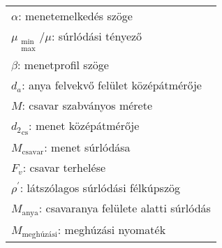 \begin{center}
	\begin{tabular}{l}
		$\alpha$: menetemelkedés szöge \siunit{}{\degree} \\
		$\mu_{\substack{\text{min}\\\text{max}}} / \mu$: súrlódási tényező \siunit{}{-} \\
		$\beta$: menetprofil szöge \siunit{}{\degree} \\
		$d_a$: anya felvekvő felület középátmérője \siunit{}{\mm} \\
		$M$: csavar szabványos mérete \siunit{}{\mm} \\
		${d_2}_\text{cs}$: menet középátmérője \siunit{}{\mm} \\
		${M_\text{csavar}}$: menet súrlódása \siunit{}{\newton\mm} \\
		$F_v$: csavar terhelése \siunit{}{\newton} \\
		$\rho^{'}$: látszólagos súrlódási félkúpszög \siunit{}{\degree} \\
		${M_\text{anya}}$: csavaranya felülete alatti súrlódás \siunit{}{\newton\mm} \\
		${M_\text{meghúzási}}$: meghúzási nyomaték \siunit{}{\newton\mm} \\
	\end{tabular}
\end{center}
